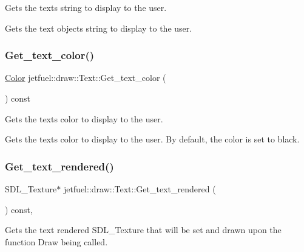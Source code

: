 Gets the text\textquotesingle{}s string to display to the user. 

Gets the text object\textquotesingle{}s string to display to the user. \mbox{\label{classjetfuel_1_1draw_1_1Text_a213dcf0fc15038eeaca73547d6c252db}} 
\subsubsection{\texorpdfstring{Get\+\_\+text\+\_\+color()}{Get\_text\_color()}}
{\footnotesize\ttfamily \hyperlink{classjetfuel_1_1draw_1_1Color}{Color} jetfuel\+::draw\+::\+Text\+::\+Get\+\_\+text\+\_\+color (\begin{DoxyParamCaption}{ }\end{DoxyParamCaption}) const\hspace{0.3cm}{\ttfamily [inline]}}



Gets the text\textquotesingle{}s color to display to the user. 

Gets the text\textquotesingle{}s color to display to the user. By default, the color is set to black. \mbox{\label{classjetfuel_1_1draw_1_1Text_a127d078edc906adec8183d825abb5b23}} 
\subsubsection{\texorpdfstring{Get\+\_\+text\+\_\+rendered()}{Get\_text\_rendered()}}
{\footnotesize\ttfamily S\+D\+L\+\_\+\+Texture$\ast$ jetfuel\+::draw\+::\+Text\+::\+Get\+\_\+text\+\_\+rendered (\begin{DoxyParamCaption}{ }\end{DoxyParamCaption}) const\hspace{0.3cm}{\ttfamily [inline]}, {\ttfamily [protected]}}



Gets the text rendered S\+D\+L\+\_\+\+Texture that will be set and drawn upon the function Draw being called. 

